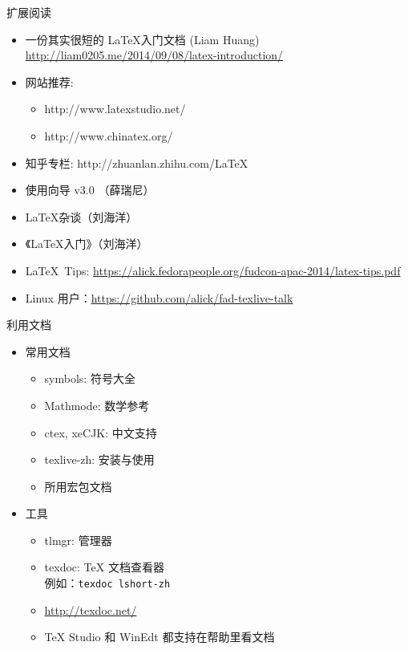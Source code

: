 \begin{frame}{扩展阅读}
  \begin{itemize}
    \item 一份其实很短的 \LaTeX 入门文档 (Liam Huang) \\
      \url{http://liam0205.me/2014/09/08/latex-introduction/}
    \item 网站推荐:
      \begin{itemize}
        \item http://www.latexstudio.net/
        \item http://www.chinatex.org/
      \end{itemize}
    \item 知乎专栏: http://zhuanlan.zhihu.com/LaTeX
    \item \ThuThesis{}使用向导 v3.0 （薛瑞尼）
    \item \LaTeX{}杂谈（刘海洋）
    \item 《\LaTeX{}入门》（刘海洋）
    \item \LaTeX\ Tips:
      \url{https://alick.fedorapeople.org/fudcon-apac-2014/latex-tips.pdf}
    \item Linux 用户：\url{https://github.com/alick/fad-texlive-talk}
  \end{itemize}
\end{frame}


\begin{frame}{利用文档}
  \begin{itemize}
    \item 常用文档
      \begin{itemize}
        \item symbols: 符号大全
        \item Mathmode: 数学参考
        \item ctex, xeCJK: 中文支持
        \item texlive-zh: \TL 安装与使用
        \item 所用宏包文档
      \end{itemize}
    \item 工具
      \begin{itemize}
        \item tlmgr: \TL 管理器
        \item texdoc: \TeX{} 文档查看器\\
          例如：\texttt{texdoc lshort-zh}
        \item \url{http://texdoc.net/}
        \item TeX Studio 和 WinEdt 都支持在帮助里看文档
      \end{itemize}
  \end{itemize}
\end{frame}


